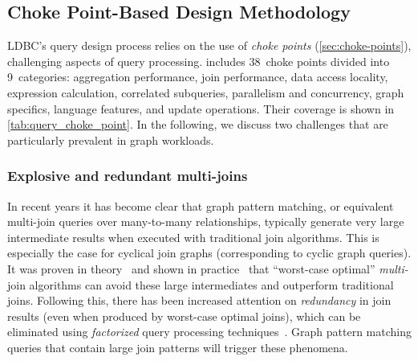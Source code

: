 \subsection{Choke Point-Based Design Methodology}

LDBC's query design process relies on the use of \emph{choke points} (\autoref{sec:choke-points}),
\ie challenging aspects of query processing.
\snbbi includes 38~choke points divided into 9~categories:
aggregation performance,
join performance,
data access locality,
expression calculation,
correlated subqueries,
parallelism and concurrency,
graph specifics,
language features,
and
update operations.
Their coverage is shown in \autoref{tab:query_choke_point}.
In the following, we discuss two challenges that are particularly prevalent in graph workloads.

\subsubsection{Explosive and redundant multi-joins}
In recent years it has become clear that graph pattern matching, or equivalent multi-join queries over many-to-many relationships, typically generate very large intermediate results when executed with traditional join algorithms. This is especially the case for cyclical join graphs (corresponding to cyclic graph queries). %
It was proven in theory~\cite{DBLP:journals/sigmod/NgoRR13} and shown in practice~\cite{DBLP:journals/corr/abs-1210-0481,DBLP:journals/pvldb/MhedhbiS19,DBLP:journals/pvldb/FreitagBSKN20} that ``worst-case optimal'' {\em multi-}join algorithms can avoid these large intermediates and outperform traditional joins. Following this, there has been increased attention on {\em redundancy} in join results (even when produced by worst-case optimal joins), which can be eliminated using {\em factorized} query processing techniques~\cite{DBLP:journals/pvldb/BakibayevOZ12,DBLP:journals/sigmod/OlteanuS16,DBLP:journals/pvldb/GuptaMS21}.
Graph pattern matching queries that contain large join patterns will trigger these phenomena.

